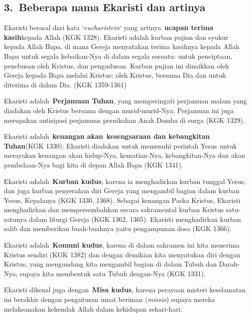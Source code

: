 \subsection[3.~Beberapa nama Ekaristi dan
artinya]{3.~\textbf{Beberapa nama Ekaristi dan artinya}}
Ekaristi berasal dari kata
{\textquoteleft}\emph{eucharistein}{\textquoteleft} yang
artinya~\textbf{ucapan terima kasih}kepada Allah (KGK 1328). Ekaristi
adalah kurban pujian dan syukur kepada Allah Bapa, di mana Gereja
menyatakan terima kasihnya kepada Allah Bapa untuk segala kebaikan-Nya
di dalam segala sesuatu: untuk penciptaan, penebusan oleh Kristus, dan
pengudusan. Kurban pujian ini dinaikkan oleh Gereja kepada Bapa melalui
Kristus: oleh Kristus, bersama Dia dan untuk diterima di dalam Dia.
(KGK 1359-1361)

Ekaristi adalah~\textbf{Perjamuan Tuhan}, yang memperingati perjamuan
malam yang diadakan oleh Kristus bersama dengan murid-murid-Nya.
Perjamuan ini juga merupakan antisipasi perjamuan pernikahan Anak Domba
di surga (KGK 1329).

Ekaristi adalah~\textbf{kenangan akan}~\textbf{kesengsaraan dan
kebangkitan Tuhan}(KGK 1330). Ekaristi diadakan untuk memenuhi perintah
Yesus untuk merayakan kenangan akan hidup-Nya, kematian-Nya,
kebangkitan-Nya dan akan pembelaan-Nya bagi kita di depan Allah Bapa
(KGK 1341).

Ekaristi adalah~\textbf{Kurban kudus}, karena ia menghadirkan kurban
tunggal Yesus, dan juga kurban penyerahan diri Gereja yang mengambil
bagian dalam kurban Yesus, Kepalanya (KGK 1330, 1368). Sebagai kenangan
Paska Kristus, Ekaristi menghadirkan dan mempersembahkan secara
sakramental kurban Kristus satu-satunya dalam liturgi Gereja (KGK 1362,
1365). Ekaristi menghadirkan kurban salib dan memberikan buah-buahnya
yaitu pengampunan dosa (KGK 1366).

Ekaristi adalah~\textbf{Komuni kudus}, karena di dalam sakramen ini kita
menerima Kristus sendiri (KGK 1382) dan dengan demikian kita menyatukan
diri dengan Kristus, yang mengundang kita mengambil bagian di dalam
Tubuh dan Darah-Nya, supaya kita membentuk satu Tubuh dengan-Nya (KGK
1331).

Ekaristi dikenal juga dengan~\textbf{Misa kudus}, karena perayaan
misteri keselamatan ini berakhir dengan pengutusan umat beriman
(\emph{missio}) supaya mereka melaksanakan kehendak Allah dalam
kehidupan sehari-hari.

